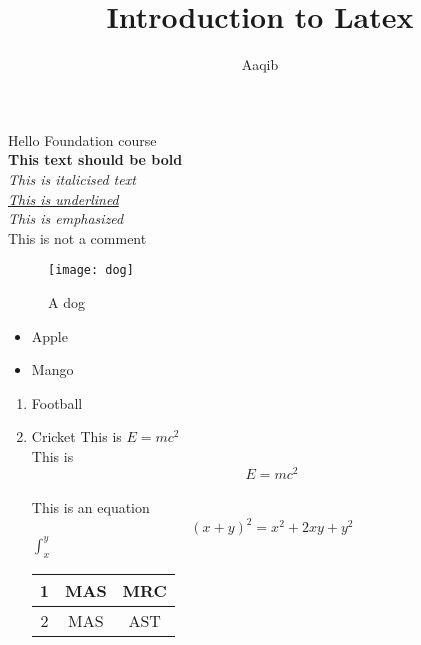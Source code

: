 \documentclass{article}
\title{Introduction to Latex}
\author{Aaqib}
\begin{document}
\maketitle
\newpage
Hello Foundation course\\
\textbf{This text should be bold}\\
\textit{This is italicised text}\\

\textit{\underline{This is underlined}}\\
\textit{This is \emph{emphasized}}\\
This is not a comment%
\begin{center}
\begin{figure}[h]
\caption{A dog}
\texttt{[image: dog]}
\end{figure}
\end{center}
\begin{itemize}
\item Apple
\item Mango
\end{itemize}
\begin{enumerate}
\item Football
\item Cricket
\newpage
This is $E =mc^2$\\
This is $$E =mc^2$$\\
This is an equation\\
\begin{equation}
(x+y)^2 = x^2 + 2xy + y^2
\end{equation}
$\int _x ^y$

\begin{tabular}{|c| c |c|}
\hline
1 & MAS & MRC \\
\hline
2 & MAS & AST\\
\hline
\end{tabular}

\end{enumerate}
\end{document}
